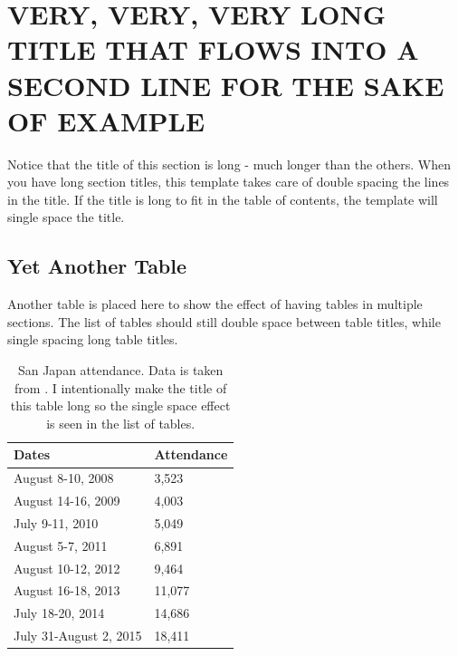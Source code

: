 %
%
%
%  
%

\chapter{VERY, VERY, VERY LONG TITLE THAT FLOWS INTO A SECOND LINE FOR THE SAKE OF EXAMPLE}

Notice that the title of this section is long - much longer than the others. When you have long section titles, this template takes care of double spacing the lines in the title. If the title is long to fit in the table of contents, the template will single space the title.

\section{Yet Another Table}

Another table is placed here to show the effect of having tables in multiple sections. The list of tables should still double space between table titles, while single spacing long table titles.

\begin{table}[h!]
	\centering
	\begin{tabular}{|l|l|}
		\hline
		Dates & Attendance  \\ \hline
		August 8-10, 2008 & 3,523  \\ \hline
		August 14-16, 2009 & 4,003 \\ \hline
		July 9-11, 2010 & 5,049 \\ \hline
		August 5-7, 2011 & 6,891  \\ \hline
		August 10-12, 2012 & 9,464  \\ \hline
		August 16-18, 2013 & 11,077  \\ \hline
		July 18-20, 2014 & 14,686 \\ \hline
		July 31-August 2, 2015 & 18,411  \\ \hline
	\end{tabular}
	\caption{San Japan attendance. Data is taken from \citep{ANCONS}. I intentionally make the title of this table long so the single space effect is seen in the list of tables.}
\end{table}

